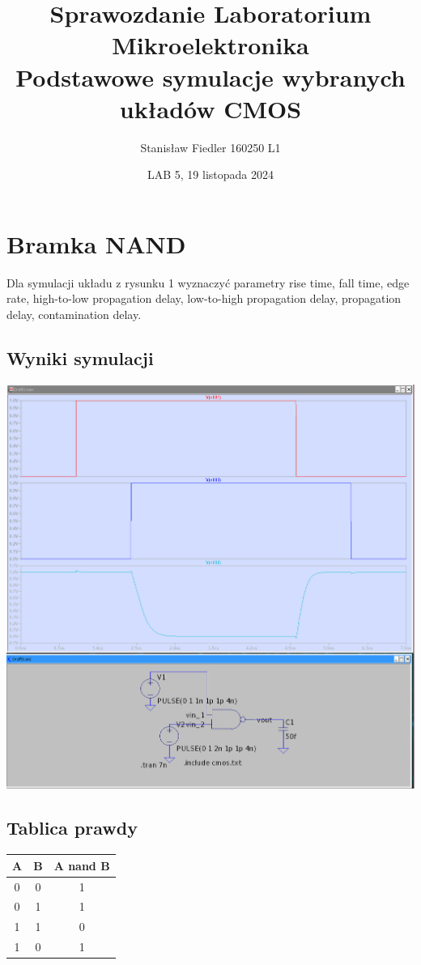 \documentclass[a4paper, 11pt]{article}
\title{%
	\vspace{-2cm}
       \large Sprawozdanie Laboratorium Mikroelektronika \\
       \huge  Podstawowe symulacje wybranych układów CMOS}
\author{Stanisław Fiedler 160250 L1}
\date{LAB 5, 19 listopada 2024}
\begin{document}
\maketitle
\tableofcontents

\section{Bramka NAND}\label{sec:nand} %
Dla symulacji układu z rysunku 1 wyznaczyć parametry rise time, fall time, edge rate,
high-to-low propagation delay, low-to-high propagation delay, propagation delay, contamination delay.
\subsection{Wyniki symulacji}\label{sub:wyniki_symulacji} %
\begin{center}
	\includegraphics[scale=0.24]{images/nand.png}
\end{center}
\subsection{Tablica prawdy}\label{sub:tablica_prawdy} %
\begin{center}
	\begin{tabular}{c|c|c}
		A & B & A nand B \\
		\hline
		0 & 0 & 1        \\
		0 & 1 & 1        \\
		1 & 1 & 0        \\
		1 & 0 & 1        \\
	\end{tabular}
\end{center}
\end{document}
